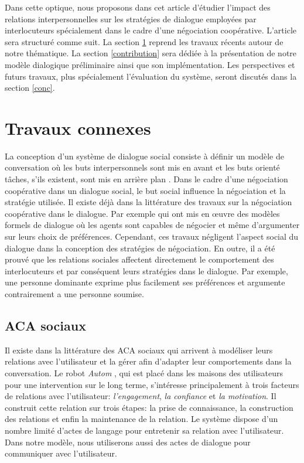 \documentclass [french]{sig-alternate-05-2015}
\begin{document}
\par Dans cette optique, nous proposons dans cet article d'étudier l'impact des relations interpersonnelles sur les stratégies de dialogue employées par interlocuteurs spécialement dans le cadre d'une négociation coopérative. L'article sera structuré comme suit. La section \ref{RW} reprend les travaux récents autour de notre thématique. La section \ref{contribution} sera dédiée à la présentation de notre modèle dialogique préliminaire ainsi que son implémentation. Les perspectives et futurs travaux, plus spécialement l'évaluation du système, seront discutés dans la section \ref{conc}.

\section{Travaux connexes}
\label{RW}
  
La conception d'un système de dialogue social consiste à définir un modèle de conversation où les buts interpersonnels sont mis en avant et les buts orienté tâches, s'ils existent, sont mis en arrière plan \cite{bickmore2005establishing}. Dans le cadre d'une négociation coopérative dans un dialogue social, le but social influence la négociation et la stratégie utilisée. Il existe déjà dans la littérature des travaux sur la négociation coopérative dans le dialogue. Par exemple \cite{amgoud2000arguments, daskalopulu1998handling} qui ont mis en œuvre des modèles formels de dialogue où les agents sont capables de négocier et même d'argumenter sur leurs choix de préférences. Cependant, ces travaux négligent l'aspect social du dialogue dans la conception des stratégies de négociation. En outre, il a été prouvé que les relations sociales affectent directement le comportement des interlocuteurs \cite{bickmore2012empirical, bickmore2005establishing, moon1998intimate, nass2000does} et par conséquent leurs stratégies dans le dialogue. Par exemple, une personne dominante exprime plus facilement ses préférences et argumente contrairement a une personne soumise. 

\subsection{ACA sociaux}

\par Il existe dans la littérature des  ACA sociaux  qui arrivent à modéliser leurs relations avec l'utilisateur et la gérer afin d'adapter leur comportements dans la conversation. Le robot \textit{Autom} \cite{kidd2005sociable}, qui est placé dans les maisons des utilisateurs pour une intervention sur le long terme, s'intéresse principalement à trois facteurs de relations avec l'utilisateur: \textit{l'engagement}, \textit{la confiance} et \textit{la motivation}. Il construit cette relation sur trois étapes: la prise de connaissance, la construction des relations et enfin la maintenance de la relation. Le système dispose d'un nombre limité d'actes de langage pour  entretenir sa relation avec l'utilisateur. Dans notre modèle, nous utiliserons aussi des actes de dialogue pour communiquer avec l'utilisateur.
\end{document}
